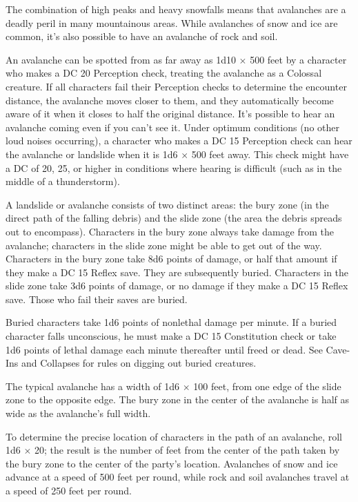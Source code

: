 				
The combination of high peaks and heavy snowfalls means that avalanches are a deadly peril in many mountainous areas. While avalanches of snow and ice are common, it's also possible to have an avalanche of rock and soil.
				
An avalanche can be spotted from as far away as 1d10 \mbox{$\times$} 500 feet by a character who makes a DC 20 Perception check, treating the avalanche as a Colossal creature. If all characters fail their Perception checks to determine the encounter distance, the avalanche moves closer to them, and they automatically become aware of it when it closes to half the original distance. It's possible to hear an avalanche coming even if you can't see it. Under optimum conditions (no other loud noises occurring), a character who makes a DC 15 Perception check can hear the avalanche or landslide when it is 1d6 \mbox{$\times$} 500 feet away. This check might have a DC of 20, 25, or higher in conditions where hearing is difficult (such as in the middle of a thunderstorm). 
				
A landslide or avalanche consists of two distinct areas: the bury zone (in the direct path of the falling debris) and the slide zone (the area the debris spreads out to encompass). Characters in the bury zone always take damage from the avalanche; characters in the slide zone might be able to get out of the way. Characters in the bury zone take 8d6 points of damage, or half that amount if they make a DC 15 Reflex save. They are subsequently buried. Characters in the slide zone take 3d6 points of damage, or no damage if they make a DC 15 Reflex save. Those who fail their saves are buried. 
				
Buried characters take 1d6 points of nonlethal damage per minute. If a buried character falls unconscious, he must make a DC 15 Constitution check or take 1d6 points of lethal damage each minute thereafter until freed or dead. See Cave-Ins and Collapses for rules on digging out buried creatures.
				
The typical avalanche has a width of 1d6 \mbox{$\times$} 100 feet, from one edge of the slide zone to the opposite edge. The bury zone in the center of the avalanche is half as wide as the avalanche's full width.
				
To determine the precise location of characters in the path of an avalanche, roll 1d6 \mbox{$\times$} 20; the result is the number of feet from the center of the path taken by the bury zone to the center of the party's location. Avalanches of snow and ice advance at a speed of 500 feet per round, while rock and soil avalanches travel at a speed of 250 feet per round.
				
